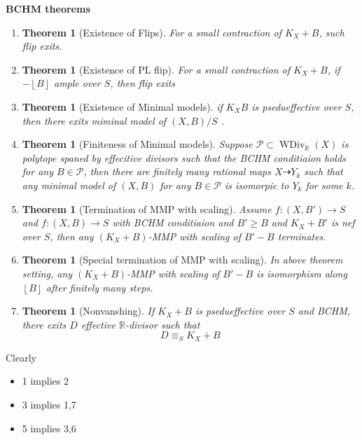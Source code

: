 \documentclass{article}
\newtheorem{thm}[defn]{Theorem}
\begin{document}
\textbf{BCHM theorems}
\begin{enumerate}
  \item 
\begin{thm}[Existence of Flips]
 For a small contraction of  $K_{X}+B$, such flip exits.
\end{thm}
\item
\begin{thm}[Existence of PL flip]
  For a small contraction of  $K_{X}+B$, if  $- \left\lfloor B \right\rfloor $ ample over $S$, then flip exits
\end{thm}
\item 
\begin{thm}[Existence of Minimal models]
  if $K_{X}
  B$ is psedueffective over $S$, then there exits miminal model of $(X,B)/S$ .
\end{thm}
\item 
\begin{thm}[Finiteness of Minimal models]
  Suppose $\mathcal{P} \subset \operatorname{WDiv}_{\mathbb{R}}(X)$ is polytope spaned by effecitive divisors such that the BCHM conditiaion holds for any $B \in \mathcal{P}$, then there are finitely many rational maps $X \dashrightarrow Y_{k}$ such that  any minimal model of $(X,B)$ for any $B \in \mathcal{P}$ is isomorpic to  $Y_{k}$ for some $k$.
\end{thm}
\item
\begin{thm}[Termination of MMP with scaling]
  Assume  $f:(X,B')\to S$ and $f:(X,B)\to S$ with BCHM conditiaion and $B'\geqslant B$ and  $K_{X}+B'$ is nef over $S$, then any  $(K_{X}+B)$-MMP with scaling of $B'-B$ terminates.
\end{thm}
\item 
\begin{thm}[Special termination of MMP with scaling]
  In above theorem setting, any $(K_{X}+B)$-MMP with scaling of  $B'-B$ is isomorphism along  $\left\lfloor B \right\rfloor $ after finitely many steps.
\end{thm}
\item
\begin{thm}[Nonvanshing]
  If $K_{X}+B$ is psedueffective over $S$ and BCHM, there exits $D$ effective $\mathbb{R}$-divisor such that 
  \[
    D\equiv_{S}K_{X}+B
  \]
\end{thm}
\end{enumerate}
Clearly
\begin{itemize}
  \item 1 implies 2
  \item 3 implies 1,7
  \item 5 implies 3,6
\end{itemize}
\end{document}
